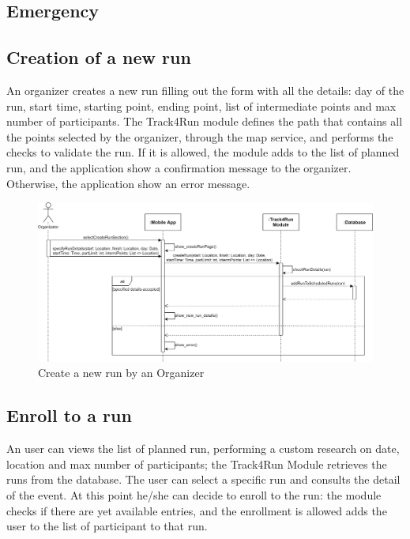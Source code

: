\subsection{Emergency }

\subsection{Creation of a new run}
An organizer creates a new run filling out the form with all the details: day of the run, start time, starting point, ending point, list of intermediate points and max number of participants. The Track4Run module defines the path that contains all the points selected by the organizer, through the map service, and performs the checks to validate the run. If it is allowed, the module adds to the list of planned run, and the application show a confirmation message to the organizer. Otherwise, the application show an error message.

\begin{figure}[H]
    \centering
    \includegraphics[scale=0.16]{./Pictures/createRunSeqDiagDD.png}
    \caption{Create a new run by an Organizer}
\end{figure}

\subsection{Enroll to a run}
An user can views the list of planned run, performing a custom research on date, location and max number of participants; the Track4Run Module retrieves the runs from the database. The user can select a specific run and consults the detail of the event. At this point he/she can decide to enroll to the run: the module checks if there are yet available entries, and the enrollment is allowed adds the user to the list of participant to that run.

